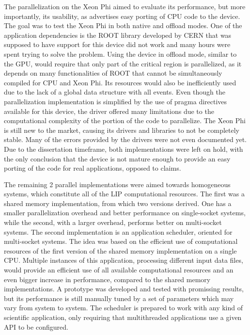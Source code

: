 The parallelization on the \intel Xeon Phi aimed to evaluate its performance, but more importantly, its usability, as \intel advertises easy porting of CPU code to the device. The goal was to test the Xeon Phi in both native and offload modes. One of the application dependencies is the ROOT library developed by CERN that was supposed to have support for this device did not work and many hours were spent trying to solve the problem. Using the device in offload mode, similar to the GPU, would require that only part of the critical region is parallelized, as it depends on many functionalities of ROOT that cannot be simultaneously compiled for CPU and Xeon Phi. Its resources would also be inefficiently used due to the lack of a global data structure with all events. Even though the parallelization implementation is simplified by the use of pragma directives available for this device, the driver offered many limitations due to the computational complexity of the portion of the code to parallelize. The Xeon Phi is still new to the market, causing its drivers and libraries to not be completely stable. Many of the errors provided by the drivers were not even documented yet. Due to the dissertation timeframe, both implementations were left on hold, with the only conclusion that the device is not mature enough to provide an easy porting of the code for real applications, opposed to \intel claims.

The remaining 2 parallel implementations were aimed towards homogeneous systems, which constitute all of the LIP computational resources. The first was a shared memory implementation, from which two versions derived. One has a smaller parallelization overhead and better performance on single-socket systems, while the second, with a larger overhead, performs better on multi-socket systems. The second implementation is an application scheduler, oriented for multi-socket systems. The idea was based on the efficient use of computational resources of the first version of the shared memory implementation on a single CPU. Multiple instances of this application, processing different input data files, would provide an efficient use of all available computational resources and an even bigger increase in performance, compared to the shared memory implementations. A prototype was developed and tested with promissing results, but its performance is still manually tuned by a set of parameters which may vary from system to system. The scheduler is prepared to work with any kind of scientific application, only requiring that multithreaded applications use a given API to be configured.

